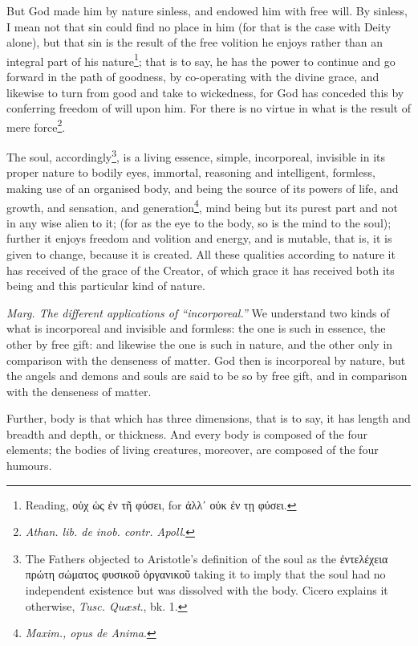 But God made him by nature sinless, and endowed him with free will. By sinless, I mean not that sin could find no place in him (for that is the case with Deity alone), but that sin is the result of the free volition he enjoys rather than an integral part of his nature\footnote{Reading, \textgreek{οὐχ ὡς ἐν τῆ φύσει}, for \textgreek{ἀλλ᾽ οὐκ ἐν τῃ φύσει}.}; that is to say, he has the power to continue and go forward in the path of goodness, by co-operating with the divine grace, and likewise to turn from good and take to wickedness, for God has conceded this by conferring freedom of will upon him. For there is no virtue in what is the result of mere force\footnote{\emph{Athan. lib. de inob. contr. Apoll}.}.

The soul, accordingly\footnote{The Fathers objected to Aristotle’s definition of the soul as the \textgreek{ἐντελέχεια πρώτη σώματος φυσικοῦ ὀργανικοῦ} taking it to imply that the soul had no independent existence but was dissolved with the body. Cicero explains it otherwise, \emph{Tusc. Quæst}., bk. 1.}, is a living essence, simple, incorporeal, invisible in its proper nature to bodily eyes, immortal, reasoning and intelligent, formless, making use of an organised body, and being the source of its powers of life, and growth, and sensation, and generation\footnote{\emph{Maxim., opus de Anima}.}, mind being but its purest part and not in any wise alien to it; (for as the eye to the body, so is the mind to the soul); further it enjoys freedom and volition and energy, and is mutable, that is, it is given to change, because it is created. All these qualities according to nature it has received of the grace of the Creator, of which grace it has received both its being and this particular kind of nature.

\emph{Marg. The different applications of “incorporeal.” }We understand two kinds of what is incorporeal and invisible and formless: the one is such in essence, the other by free gift: and likewise the one is such in nature, and the other only in comparison with the denseness of matter. God then is incorporeal by nature, but the angels and demons and souls are said to be so by free gift, and in comparison with the denseness of matter.

Further, body is that which has three dimensions, that is to say, it has length and breadth and depth, or thickness. And every body is composed of the four elements; the bodies of living creatures, moreover, are composed of the four humours.

